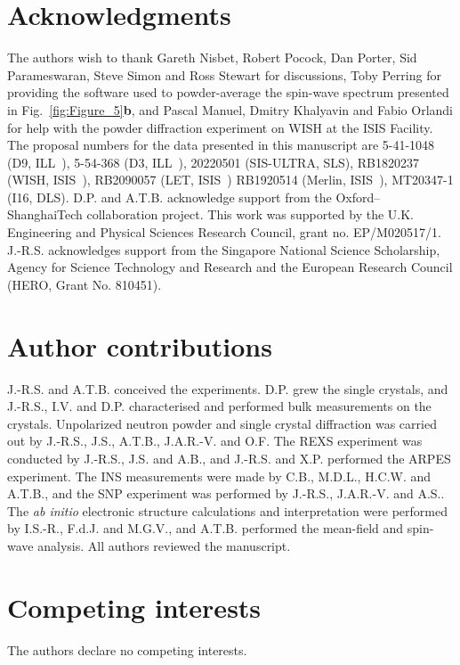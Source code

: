 \documentclass[aps,prl,amsmath,amssymb,amstext,citeautoscript,punctuation,nofootinbib,superscriptaddress,twocolumn]{revtex4-1}
\begin{document}
\section{Acknowledgments}
\begin{acknowledgments}
The authors  wish  to  thank Gareth Nisbet, Robert Pocock, Dan Porter, Sid Parameswaran, Steve Simon and Ross Stewart for discussions, Toby Perring for providing the software used to  powder-average the spin-wave spectrum presented in Fig.~\ref{fig:Figure_5}\textbf{b}, and  Pascal Manuel, Dmitry Khalyavin and Fabio Orlandi for help with the powder diffraction experiment on WISH at the ISIS Facility. The proposal numbers for the data presented in this manuscript are 5-41-1048 (D9, ILL~\cite{NDD9}), 5-54-368 (D3, ILL~\cite{SNPD3}), 20220501 (SIS-ULTRA, SLS), RB1820237 (WISH, ISIS~\cite{ISIS_EuCuAs}), RB2090057 (LET, ISIS~\cite{LET_EuCuAs}) RB1920514 (Merlin, ISIS~\cite{Merlin_EuCuAs}), MT20347-1 (I16, DLS). D.P. and A.T.B. acknowledge support from the Oxford–ShanghaiTech collaboration project. This work was supported by the U.K. Engineering and Physical Sciences Research Council, grant no. EP/M020517/1. J.-R.S. acknowledges support from the Singapore National Science Scholarship, Agency for Science Technology and Research and the European Research Council (HERO, Grant No. 810451). 
\end{acknowledgments}


\section{Author contributions}
J.-R.S. and A.T.B. conceived the experiments. D.P. grew the single crystals, and J.-R.S., I.V. and D.P. characterised and performed bulk measurements on the crystals. Unpolarized neutron powder and single crystal diffraction was carried out by J.-R.S., J.S., A.T.B., J.A.R.-V. and O.F. The REXS experiment was conducted by J.-R.S., J.S. and A.B., and J.-R.S. and X.P. performed the ARPES experiment.  The INS measurements were made by C.B., M.D.L., H.C.W. and A.T.B., and  the SNP experiment was performed by J.-R.S., J.A.R.-V. and A.S..  The \textit{ab initio} electronic structure calculations and interpretation were performed by I.S.-R., F.d.J. and M.G.V., and A.T.B.  performed the mean-field and spin-wave analysis.  All authors reviewed the manuscript.

\section{Competing interests}
The authors declare no competing interests.
\end{document}
